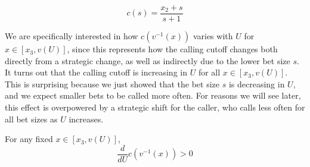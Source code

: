 \documentclass[../../main/main.tex]{subfiles}
\begin{document}
$$c(s) = \frac{x_2 + s}{s+1}$$

We are specifically interested in how $c(v^{-1}(x))$ varies with $U$ for $x \in [x_3, v(U)]$, since this represents how the calling cutoff changes both directly from a strategic change, as well as indirectly due to the lower bet size $s$. It turns out that the calling cutoff is increasing in $U$ for all $x \in [x_3, v(U)]$. This is surprising because we just showed that the bet size $s$ is decreasing in $U$, and we expect smaller bets to be called more often. For reasons we will see later, this effect is overpowered by a strategic shift for the caller, who calls less often for all bet sizes as $U$ increases.

\begin{lemma}
    \label{lem:c_increasing}
    For any fixed $x \in [x_3, v(U)]$,
    \[
        \frac{d}{dU} c(v^{-1}(x)) > 0
    \]
\end{lemma}
\end{document}
